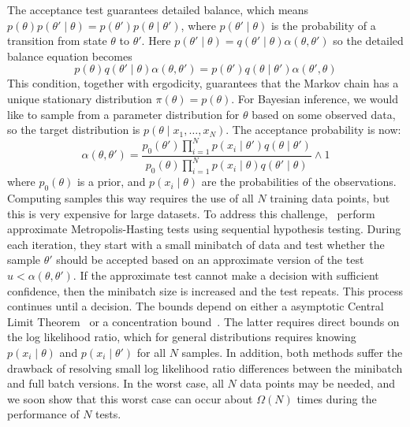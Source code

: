 \documentclass[twoside]{article} \usepackage{aistats2017}
\begin{document}
The acceptance test guarantees detailed balance, which means
$p(\theta)p(\theta'\mid\theta) = p(\theta')p(\theta \mid\theta')$,
where $p(\theta'\mid\theta)$ is the probability of a transition from state
$\theta$ to $\theta'$. Here $p(\theta'\mid\theta) =
q(\theta'\mid\theta)\alpha(\theta,\theta')$ so the detailed balance equation
becomes 
\begin{equation}\label{eq:detailed_balance2}
    p(\theta)q(\theta'\mid\theta)\alpha(\theta,\theta') = p(\theta')q(\theta\mid\theta')\alpha(\theta',\theta)
\end{equation}
This condition, together with ergodicity, guarantees that the Markov chain has a
unique stationary distribution $\pi(\theta) = p(\theta)$. For Bayesian inference, we would like to sample from a parameter distribution for $\theta$ based on some observed data, so the target distribution is
$p(\theta \mid x_1, \ldots, x_N)$. The acceptance probability is now:
\begin{equation}\label{eq:acceptance_probability}
    \alpha(\theta,\theta') = 
    \frac{p_0(\theta')\prod_{i=1}^N p(x_i \mid \theta')q(\theta \mid
    \theta')}{p_0(\theta)\prod_{i=1}^N p(x_i \mid \theta)q(\theta' \mid\theta)}
    \wedge 1
\end{equation}
where $p_0(\theta)$ is a prior, and $p(x_i \mid \theta)$ are the probabilities
of the observations. Computing samples this way requires the use of all $N$
training data points, but this is very expensive for large datasets. To address
this challenge,~\citet{cutting_mh_2014,icml2014c1_bardenet14} perform approximate
Metropolis-Hasting tests using sequential hypothesis testing. During each
iteration, they start with a small minibatch of data and test whether the sample $\theta'$ 
should be accepted based on an approximate version of
the test $u < \alpha(\theta,\theta')$. If the approximate test cannot make a
decision with sufficient confidence, then the minibatch size is increased and
the test repeats. This process continues until a decision. The bounds depend on
either a asymptotic Central Limit Theorem~\citep{cutting_mh_2014} or a
concentration bound~\citep{icml2014c1_bardenet14}. The latter requires direct
bounds on the log likelihood ratio, which for general distributions requires
knowing $p(x_i \mid \theta)$ and $p(x_i \mid \theta')$ for all $N$ samples. In
addition, both methods suffer the drawback of resolving small log likelihood
ratio differences between the minibatch and full batch versions.  In the worst
case, all $N$ data points may be needed, and we soon show that this worst case
can occur about $\Omega(N)$ times during the performance of $N$ tests.
\end{document}
